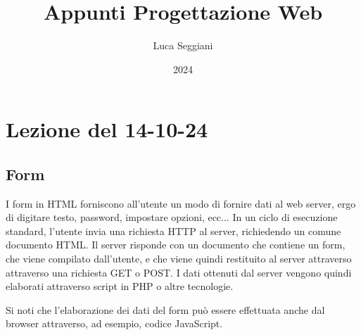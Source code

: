 \documentclass[a4paper,11pt]{article}
\title{Appunti Progettazione Web}
\author{Luca Seggiani}
\date{2024}
\begin{document}
\section{Lezione del 14-10-24}

\thispagestyle{empty}
\pagestyle{fancy}

\lstset{language=html, style=codestyle}

\subsection{Form}
I form in HTML forniscono all'utente un modo di fornire dati al web server, ergo di digitare testo, password, impostare opzioni, ecc...
In un ciclo di esecuzione standard, l'utente invia una richiesta HTTP al server, richiedendo un comune documento HTML.
Il server risponde con un documento che contiene un form, che viene compilato dall'utente, e che viene quindi restituito al server attraverso attraverso una richiesta GET o POST.
I dati ottenuti dal server vengono quindi elaborati attraverso script in PHP o altre tecnologie.

Si noti che l'elaborazione dei dati del form può essere effettuata anche dal browser attraverso, ad esempio, codice JavaScript.
\end{document}
